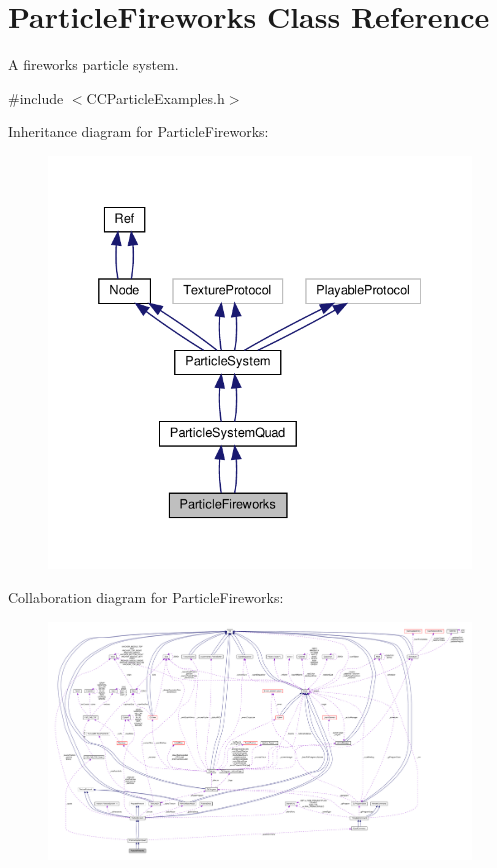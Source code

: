 \hypertarget{classParticleFireworks}{}\section{Particle\+Fireworks Class Reference}
\label{classParticleFireworks}


A fireworks particle system.  




{\ttfamily \#include $<$C\+C\+Particle\+Examples.\+h$>$}



Inheritance diagram for Particle\+Fireworks\+:
\nopagebreak
\begin{figure}[H]
\begin{center}
\leavevmode
\includegraphics[width=332pt]{classParticleFireworks__inherit__graph}
\end{center}
\end{figure}


Collaboration diagram for Particle\+Fireworks\+:
\nopagebreak
\begin{figure}[H]
\begin{center}
\leavevmode
\includegraphics[width=350pt]{classParticleFireworks__coll__graph}
\end{center}
\end{figure}
